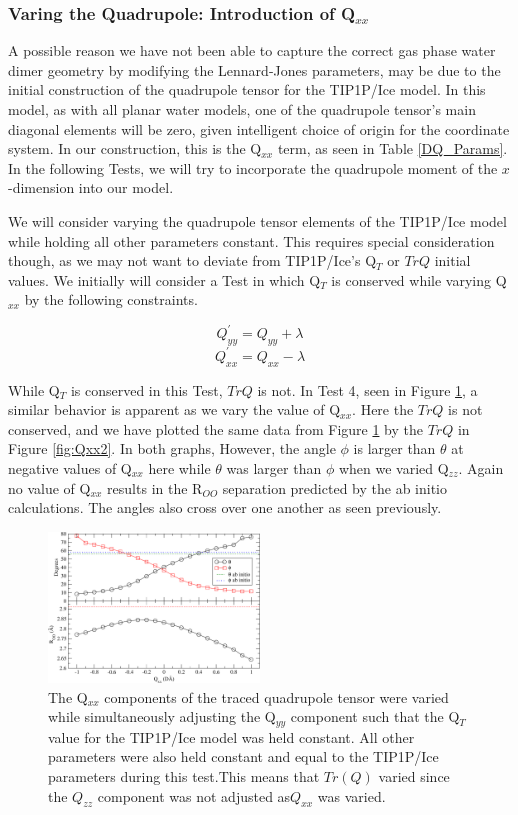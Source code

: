 \documentclass[aps, jcp, prl, reprint, groupedaddress, superscriptaddress, twocolumn]{revtex4-1}
\begin{document}
\subsubsection{Varing the Quadrupole: Introduction of Q$_{xx}$}
A possible reason we have not been able to capture the correct gas phase water
dimer geometry by modifying the Lennard-Jones parameters, may be due to the
initial construction of the quadrupole tensor for the TIP1P/Ice model. In this
model,
as with all planar water models, one of the quadrupole tensor's main diagonal
elements will be zero, given intelligent choice of origin for the coordinate
system. In our construction, this is the Q$_{xx}$ term, as seen in Table
\ref{DQ_Params}. In the following Tests, we will try to incorporate 
the quadrupole moment of the $x$-dimension into our model.

We will consider varying the quadrupole tensor elements of the TIP1P/Ice
model while holding all other parameters constant. This requires special 
consideration though, as we may not want to deviate from TIP1P/Ice's Q$_T$
or $TrQ$ initial values. We initially will consider a Test in which Q$_T$ is 
conserved while varying Q$_{xx}$ by the following constraints. 

\begin{equation}
Q_{yy}^{'} = Q_{yy} + \lambda
\end{equation} 
\begin{equation}
Q_{xx}^{'} = Q_{xx} - \lambda
\end{equation}

While Q$_T$ is conserved in this Test, $TrQ$ is not. In Test 4, seen in Figure
\ref{fig:Qxx}, a similar behavior is apparent as we vary the value of Q$_{xx}$.
Here the $TrQ$ is not conserved, and we have plotted the same data from 
Figure \ref{fig:Qxx} by the $TrQ$ in Figure \ref{fig:Qxx2}. In both graphs,
However, the angle $\phi$ is larger
than $\theta$ at negative values of Q$_{xx}$ here while $\theta$ was larger 
than $\phi$ when we varied Q$_{zz}$. Again no value of Q$_{xx}$ results in the
R$_{OO}$ separation predicted by the ab initio calculations. The angles
also cross over one another as seen previously.  

\begin{figure}[h!]
\includegraphics[width = 0.5\textwidth]{Test4_plot.pdf}
\caption{\label{fig:Qxx} The Q$_{xx}$ components of the traced quadrupole tensor were varied while simultaneously adjusting the Q$_{yy}$ component such that the Q$_T$ value for the TIP1P/Ice model was held constant. All other parameters were also held constant and equal to the TIP1P/Ice parameters during this test.This means that $Tr(Q)$ varied since the $Q_{zz}$ component was not adjusted as$Q_{xx}$ was varied.}
\end{figure}
\end{document}
